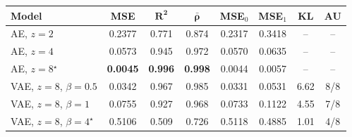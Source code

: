 \begin{tabular}{lccccccc}
\hline
\textbf{Model} & \textbf{MSE} & $\mathbf{R^2}$ & $\bar{\boldsymbol{\rho}}$ & \textbf{MSE$_0$} & \textbf{MSE$_1$} & \textbf{KL} & \textbf{AU} \\ \hline
AE, $z=2$ & 0.2377 & 0.771 & 0.874 & 0.2317 & 0.3418 & -- & -- \\
AE, $z=4$ & 0.0573 & 0.945 & 0.972 & 0.0570 & 0.0635 & -- & -- \\
AE, $z=8$$^\star$ & \textbf{0.0045} & \textbf{0.996} & \textbf{0.998} & 0.0044 & 0.0057 & -- & -- \\
\hline
VAE, $z=8$, $\beta=0.5$ & 0.0342 & 0.967 & 0.985 & 0.0331 & 0.0531 & 6.62 & 8/8 \\
VAE, $z=8$, $\beta=1$ & 0.0755 & 0.927 & 0.968 & 0.0733 & 0.1122 & 4.55 & 7/8 \\
VAE, $z=8$, $\beta=4$$^\star$ & 0.5106 & 0.509 & 0.726 & 0.5118 & 0.4885 & 1.01 & 4/8 \\
\hline
\end{tabular}
